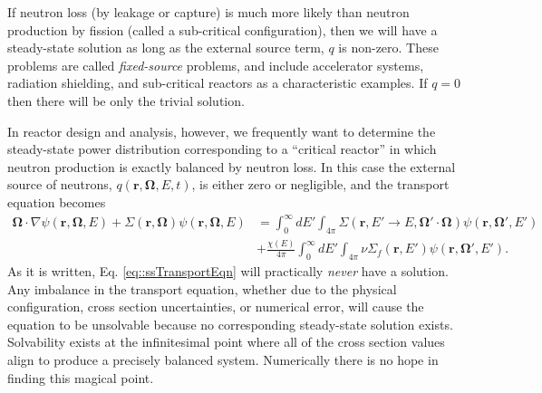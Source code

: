\documentclass[11pt]{article}
\renewcommand\vec{\mathbf}
\begin{document}
If neutron loss (by leakage or capture) is much more likely than neutron production by fission (called a sub-critical configuration), then we will have a steady-state solution as long as the external source term, \(q\) is non-zero.  These problems are called \emph{fixed-source} problems, and include accelerator systems, radiation shielding, and sub-critical reactors as a characteristic examples.  If \(q=0\) then there will be only the trivial solution.

In reactor design and analysis, however, we frequently want to determine the steady-state power distribution corresponding to a ``critical reactor'' in which neutron production is exactly balanced by neutron loss.  In this case the external source of neutrons, \(q(\vec{r},\vec{\Omega},E,t)\), is either zero or negligible, and the transport equation becomes
\begin{align}
  \vec{\Omega} \cdot \nabla\psi(\vec{r},\vec{\Omega},E)
  + \Sigma(\vec{r},\vec{\Omega}) \psi(\vec{r},\vec{\Omega},E)
  &= \int_0^\infty dE' \int_{4\pi} \Sigma(\vec{r},E' \rightarrow E, \vec{\Omega}'\cdot\vec{\Omega}) \psi(\vec{r},\vec{\Omega}',E') \\
  &+ \frac{\chi(E)}{4\pi} \int_0^\infty dE' \int_{4\pi} \nu\Sigma_f(\vec{r},E') \psi(\vec{r},\vec{\Omega}',E').
  \label{eq::ssTransportEqn}
\end{align}
As it is written, Eq. \eqref{eq::ssTransportEqn} will practically \emph{never} have a solution.  Any imbalance in the transport equation, whether due to the physical configuration, cross section uncertainties, or numerical error, will cause the equation to be unsolvable because no corresponding steady-state solution exists.  Solvability exists at the infinitesimal point where all of the cross section values align to produce a precisely balanced system.  Numerically there is no hope in finding this magical point.
\end{document}
